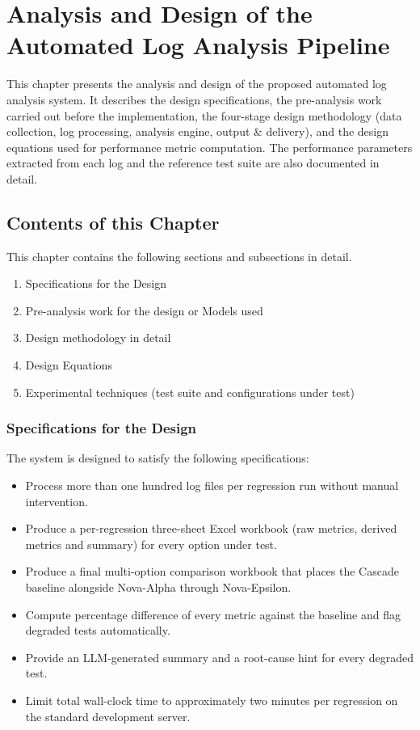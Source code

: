 \chapter{Analysis and Design of the Automated Log Analysis Pipeline}

This chapter presents the analysis and design of the proposed automated log analysis system. It describes the design specifications, the pre-analysis work carried out before the implementation, the four-stage design methodology (data collection, log processing, analysis engine, output \& delivery), and the design equations used for performance metric computation. The performance parameters extracted from each log and the reference test suite are also documented in detail.

\section{Contents of this Chapter}
This chapter contains the following sections and subsections in detail.
\begin{enumerate}
\item Specifications for the Design
\item Pre-analysis work for the design or Models used
\item Design methodology in detail
\item Design Equations
\item Experimental techniques (test suite and configurations under test)
\end{enumerate}

\subsection{Specifications for the Design}
The system is designed to satisfy the following specifications:
\begin{itemize}
\item Process more than one hundred log files per regression run without manual intervention.
\item Produce a per-regression three-sheet Excel workbook (raw metrics, derived metrics and summary) for every option under test.
\item Produce a final multi-option comparison workbook that places the Cascade baseline alongside Nova-Alpha through Nova-Epsilon.
\item Compute percentage difference of every metric against the baseline and flag degraded tests automatically.
\item Provide an LLM-generated summary and a root-cause hint for every degraded test.
\item Limit total wall-clock time to approximately two minutes per regression on the standard development server.
\end{itemize}

